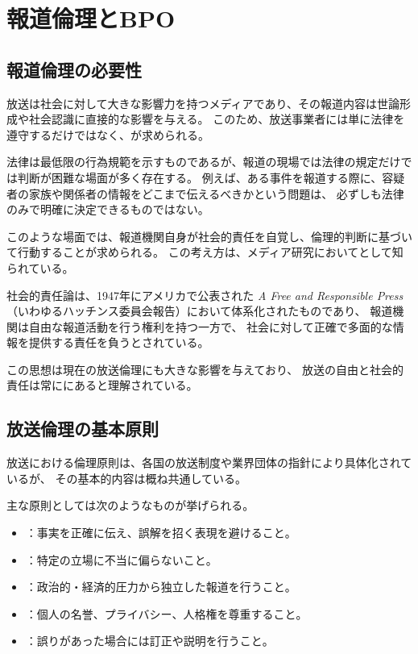 \section{報道倫理とBPO}
\subsection{報道倫理の必要性}

放送は社会に対して大きな影響力を持つメディアであり、その報道内容は世論形成や社会認識に直接的な影響を与える。
このため、放送事業者には単に法律を遵守するだけではなく、が求められる。

法律は最低限の行為規範を示すものであるが、報道の現場では法律の規定だけでは判断が困難な場面が多く存在する。
例えば、ある事件を報道する際に、容疑者の家族や関係者の情報をどこまで伝えるべきかという問題は、
必ずしも法律のみで明確に決定できるものではない。

このような場面では、報道機関自身が社会的責任を自覚し、倫理的判断に基づいて行動することが求められる。
この考え方は、メディア研究においてとして知られている。

社会的責任論は、1947年にアメリカで公表された
\emph{A Free and Responsible Press}（いわゆるハッチンス委員会報告）において体系化されたものであり、
報道機関は自由な報道活動を行う権利を持つ一方で、
社会に対して正確で多面的な情報を提供する責任を負うとされている。

この思想は現在の放送倫理にも大きな影響を与えており、
放送の自由と社会的責任は常ににあると理解されている。

\subsection{放送倫理の基本原則}

放送における倫理原則は、各国の放送制度や業界団体の指針により具体化されているが、
その基本的内容は概ね共通している。

主な原則としては次のようなものが挙げられる。

\begin{itemize}
  \item {}：事実を正確に伝え、誤解を招く表現を避けること。
  \item {}：特定の立場に不当に偏らないこと。
  \item {}：政治的・経済的圧力から独立した報道を行うこと。
  \item {}：個人の名誉、プライバシー、人格権を尊重すること。
  \item {}：誤りがあった場合には訂正や説明を行うこと。
\end{itemize}

